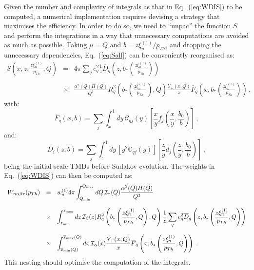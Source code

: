 \documentclass[10pt,a4paper]{article}
\begin{document}
Given the number and complexity of integrals as that in
Eq.~(\ref{eq:WDIS}) to be computed, a numerical implementation
requires devising a strategy that maximises the efficiency. In order
to do so, we need to ``unpac'' the function $S$ and perform the
integrations in a way that unnecessary computations are avoided as
much as possible. Taking $\mu = Q$ and $b = z\xi_n^{(1)} /p_{Th}$, and
dropping the unnecessary dependencies, Eq.~(\ref{eq:Sall}) can be
conveniently reorganised as:
\begin{equation}
\begin{array}{rcl}
\displaystyle
  S\left(x,z,\frac{z\xi_n^{(1)}}{p_{Th}},Q\right)&=&\displaystyle
                                                     4\pi\sum_qe_q^2\frac1{z}\overline{D}_q\left(z,b_*\left(\frac{z\xi_n^{(1)}}{p_{Th}}\right)\right)\\
\\
&\times&\displaystyle \frac{\alpha^2(Q)H(Q)}{Q^3}R_q^2\left(b_*\left(\frac{z\xi_n^{(1)}}{p_{Th}}\right),Q\right)\frac{Y_+(x,Q)}{x}\overline{F}_q\left(x,b_*\left(\frac{z\xi_n^{(1)}}{p_{Th}}\right)\right)\,.
\end{array}
\end{equation}
with:
\begin{equation}
\overline{F}_q(x,b) = \sum_{j}\int_x^1dy\,\mathcal{C}_{qj}(y)\left[\frac{x}{y}f_j\left(\frac{x}{y},\frac{b_0}{b}\right)\right]\,,
\end{equation}
and:
\begin{equation}
\overline{D}_{i}(z,b) = \sum_{j}\int_z^1dy\,\left[y^2\mathbb{C}_{qj}(y)\right]\left[\frac{z}{y}d_j\left(\frac{z}{y}, \frac{b_0}{b}\right)\right]\,,
\end{equation}
being the initial scale TMDs before Sudakov evolution. The weights in
Eq.~(\ref{eq:WDIS}) can then be computed as:
\begin{equation}
\begin{array}{rcl}
\displaystyle
  W_{n\alpha\beta\tau}(p_{Th})&=&\displaystyle w_n^{(1)}
                                  4\pi
         \int_{Q_{\rm min}}^{Q_{\rm
      max}}dQ\,\mathcal{I}_\tau(Q) \frac{\alpha^2(Q)H(Q)}{Q^3}\\
\\
&\times&\displaystyle\int_{z_{\rm min}}^{z_{\rm max}}dz\,
  \mathcal{I}_\beta(z) 
                                                     R_q^2\left(b_*\left(\frac{z\xi_n^{(1)}}{p_{Th}},Q\right),Q\right)\frac1{z}\sum_qe_q^2 \overline{D}_q\left(z,b_*\left(\frac{z\xi_n^{(1)}}{p_{Th}},Q\right)\right)\\
\\
&\times&\displaystyle \int_{\overline{x}_{\rm min}(Q)}^{\overline{x}_{\rm
      max}(Q)}dx\, \mathcal{I}_\alpha(x)\frac{Y_+(x,Q)}{x}\overline{F}_q\left(x,b_*\left(\frac{z\xi_n^{(1)}}{p_{Th}},Q\right)\right)\,.
\end{array}
\end{equation}
This nesting should optimise the computation of the integrals.
\end{document}
